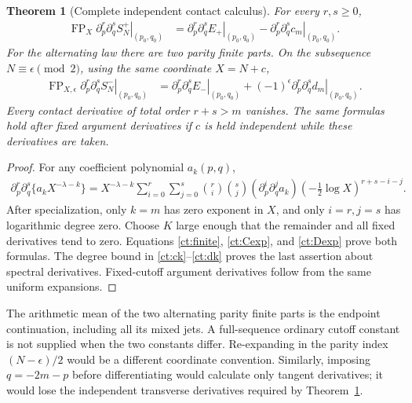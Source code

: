 \documentclass[11pt,letterpaper]{article}
\numberwithin{equation}{section}
\newtheorem{theorem}{Theorem}[section]
\theoremstyle{definition}
\theoremstyle{remark}
\begin{document}
\begin{theorem}[Complete independent contact calculus]\label{ct:contacts}
For every $r,s\ge0$,
\begin{align}
 \operatorname{FP}_X
 \left.\partial_p^r\partial_q^sS_N^+\right|_{(p_0,q_0)}
 &=\left.\partial_p^r\partial_q^sE_+\right|_{(p_0,q_0)}
    -\left.\partial_p^r\partial_q^sc_m\right|_{(p_0,q_0)}.
                                          \label{ct:pluscontact}
\end{align}
For the alternating law there are two parity finite parts. On the
subsequence $N\equiv\epsilon\pmod2$, using the same coordinate $X=N+c$,
\begin{align}
 \operatorname{FP}_{X,\epsilon}
 \left.\partial_p^r\partial_q^sS_N^-\right|_{(p_0,q_0)}
 &=\left.\partial_p^r\partial_q^sE_-\right|_{(p_0,q_0)}
   +(-1)^\epsilon\left.\partial_p^r\partial_q^sd_m\right|_{(p_0,q_0)}.
                                          \label{ct:minuscontact}
\end{align}
Every contact derivative of total order $r+s>m$ vanishes. The same formulas
hold after fixed argument derivatives if $c$ is held independent while
these derivatives are taken.
\end{theorem}
\begin{proof}
For any coefficient polynomial $a_k(p,q)$,
\begin{align}
 \partial_p^r\partial_q^s\{a_kX^{-\lambda-k}\}
 =X^{-\lambda-k}\sum_{i=0}^r\sum_{j=0}^s
 \binom ri\binom sj(\partial_p^i\partial_q^ja_k)
             \left(-\tfrac12\log X\right)^{r+s-i-j}.
 \label{ct:logjets}
\end{align}
After specialization, only $k=m$ has zero exponent in $X$, and only
$i=r,j=s$ has logarithmic degree zero. Choose $K$ large enough that the
remainder and all fixed derivatives tend to zero. Equations
\eqref{ct:finite}, \eqref{ct:Cexp}, and \eqref{ct:Dexp} prove both formulas.
The degree bound in \eqref{ct:ck}--\eqref{ct:dk} proves the last assertion
about spectral derivatives. Fixed-cutoff argument derivatives follow from
the same uniform expansions.
\end{proof}

The arithmetic mean of the two alternating parity finite parts is the
endpoint continuation, including all its mixed jets. A full-sequence
ordinary cutoff constant is not supplied when the two constants differ.
Re-expanding in the parity index $(N-\epsilon)/2$ would be a different
coordinate convention. Similarly, imposing $q=-2m-p$ before differentiating
would calculate only tangent derivatives; it would lose the independent
transverse derivatives required by Theorem~\ref{ct:contacts}.
\end{document}
